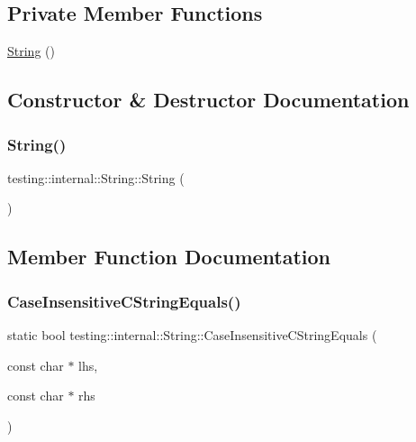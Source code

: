 \subsection*{Private Member Functions}
\begin{DoxyCompactItemize}
\item 
\hyperlink{classtesting_1_1internal_1_1String_a7c370de44fce74608d0b7e3dd29de035}{String} ()
\end{DoxyCompactItemize}


\subsection{Constructor \& Destructor Documentation}
\mbox{\label{classtesting_1_1internal_1_1String_a7c370de44fce74608d0b7e3dd29de035}} 
\subsubsection{\texorpdfstring{String()}{String()}}
{\footnotesize\ttfamily testing\+::internal\+::\+String\+::\+String (\begin{DoxyParamCaption}{ }\end{DoxyParamCaption})\hspace{0.3cm}{\ttfamily [private]}}



\subsection{Member Function Documentation}
\mbox{\label{classtesting_1_1internal_1_1String_a7ce24c41c67b928fe89434d3571c988c}} 
\subsubsection{\texorpdfstring{Case\+Insensitive\+C\+String\+Equals()}{CaseInsensitiveCStringEquals()}}
{\footnotesize\ttfamily static bool testing\+::internal\+::\+String\+::\+Case\+Insensitive\+C\+String\+Equals (\begin{DoxyParamCaption}\item[{const char $\ast$}]{lhs,  }\item[{const char $\ast$}]{rhs }\end{DoxyParamCaption})\hspace{0.3cm}{\ttfamily [static]}}


